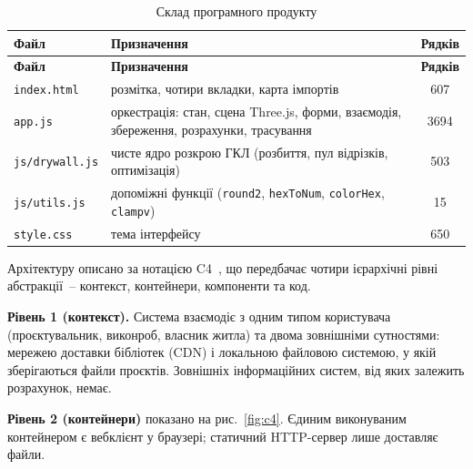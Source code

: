 \begin{spacing}{1.15}
\small\noindent
\begin{xltabular}{\textwidth}{| >{\raggedright\arraybackslash}p{3.3cm} | >{\raggedright\arraybackslash}X | c |}
    \caption{Склад програмного продукту} \label{tab:modules} \\
    \hline
    \textbf{Файл} & \textbf{Призначення} & \textbf{Рядків} \\ \hline
    \endfirsthead

    \hline
    \textbf{Файл} & \textbf{Призначення} & \textbf{Рядків} \\ \hline
    \endhead

    \texttt{index.html} & розмітка, чотири вкладки, карта імпортів & 607 \\ \hline
    \texttt{app.js} & оркестрація: стан, сцена Three.js, форми, взаємодія, збереження, розрахунки, трасування & 3694 \\ \hline
    \texttt{js/drywall.js} & чисте ядро розкрою ГКЛ (розбиття, пул відрізків, оптимізація) & 503 \\ \hline
    \texttt{js/utils.js} & допоміжні функції (\texttt{round2}, \texttt{hexToNum}, \texttt{colorHex}, \texttt{clampv}) & 15 \\ \hline
    \texttt{style.css} & тема інтерфейсу & 650 \\ \hline
\end{xltabular}
\end{spacing}


Архітектуру описано за нотацією C4~, що передбачає чотири ієрархічні рівні абстракції~-- контекст, контейнери, компоненти та код.

\textbf{Рівень 1 (контекст).} Система взаємодіє з одним типом користувача (проєктувальник, виконроб, власник житла) та двома зовнішніми сутностями: мережею доставки бібліотек (CDN) і локальною файловою системою, у якій зберігаються файли проєктів. Зовнішніх інформаційних систем, від яких залежить розрахунок, немає.

\textbf{Рівень 2 (контейнери)} показано на рис.~\ref{fig:c4}. Єдиним виконуваним контейнером є вебклієнт у браузері; статичний HTTP-сервер лише доставляє файли.


